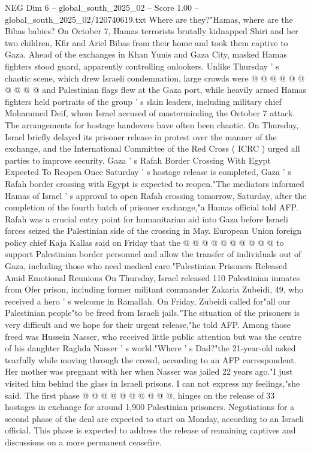 \begin{textsample}{NEG Dim 6 – global\_south\_2025\_02 – Score 1.00 – global\_south\_2025\_02/120740619.txt}
Where are they?"Hamas, where are the Bibas babies?
On October 7, Hamas terrorists brutally kidnapped Shiri and her two children, Kfir and Ariel Bibas from their home and took them captive to Gaza.
Ahead of the exchanges in Khan Yunis and Gaza City, masked Hamas fighters stood guard, apparently controlling onlookers.
Unlike Thursday ' s chaotic scene, which drew Israeli condemnation, large crowds were @ @ @ @ @ @ @ @ @ @ and Palestinian flags flew at the Gaza port, while heavily armed Hamas fighters held portraits of the group ' s slain leaders, including military chief Mohammed Deif, whom Israel accused of masterminding the October 7 attack.
The arrangements for hostage handovers have often been chaotic.
On Thursday, Israel briefly delayed its prisoner release in protest over the manner of the exchange, and the International Committee of the Red Cross ( ICRC ) urged all parties to improve security.
Gaza ' s Rafah Border Crossing With Egypt Expected To Reopen Once Saturday ' s hostage release is completed, Gaza ' s Rafah border crossing with Egypt is expected to reopen."The mediators informed Hamas of Israel ' s approval to open Rafah crossing tomorrow, Saturday, after the completion of the fourth batch of prisoner exchange,"a Hamas official told AFP.
Rafah was a crucial entry point for humanitarian aid into Gaza before Israeli forces seized the Palestinian side of the crossing in May.
European Union foreign policy chief Kaja Kallas said on Friday that the @ @ @ @ @ @ @ @ @ @ to support Palestinian border personnel and allow the transfer of individuals out of Gaza, including those who need medical care."Palestinian Prisoners Released Amid Emotional Reunions On Thursday, Israel released 110 Palestinian inmates from Ofer prison, including former militant commander Zakaria Zubeidi, 49, who received a hero ' s welcome in Ramallah.
On Friday, Zubeidi called for"all our Palestinian people"to be freed from Israeli jails."The situation of the prisoners is very difficult and we hope for their urgent release,"he told AFP.
Among those freed was Hussein Nasser, who received little public attention but was the centre of his daughter Raghda Nasser ' s world."Where ' s Dad?"the 21-year-old asked tearfully while moving through the crowd, according to an AFP correspondent.
Her mother was pregnant with her when Nasser was jailed 22 years ago."I just visited him behind the glass in Israeli prisons.
I can not express my feelings,"she said.
The first phase @ @ @ @ @ @ @ @ @ @, hinges on the release of 33 hostages in exchange for around 1,900 Palestinian prisoners.
Negotiations for a second phase of the deal are expected to start on Monday, according to an Israeli official.
This phase is expected to address the release of remaining captives and discussions on a more permanent ceasefire.

\end{textsample}
